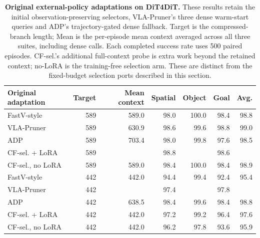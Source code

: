 \begin{table}[t]
  \centering
  \caption{\textbf{Original external-policy adaptations on DiT4DiT.}
  These results retain the initial observation-preserving selectors, VLA-Pruner's three dense warm-start queries and ADP's trajectory-gated dense fallback.
  Target is the compressed-branch length; Mean is the per-episode mean context averaged across all three suites, including dense calls.
  Each completed success rate uses 500 paired episodes.
  CF-sel.'s additional full-context probe is extra work beyond the retained context; no-LoRA is the training-free selection arm.
  These are distinct from the fixed-budget selection ports described in this section.}
  \label{tab:dit4dit_original_external}
  \footnotesize
  \setlength{\tabcolsep}{5pt}
  \begin{tabular}{lrrrrrr}
    \toprule
    Original adaptation & Target & Mean context & Spatial & Object & Goal & Avg. \\
    \midrule
    FastV-style & 589 & 589.0 & 98.0 & 100.0 & 98.4 & 98.8 \\
    VLA-Pruner & 589 & 630.9 & 98.6 & 99.6 & 98.8 & 99.0 \\
    ADP & 589 & 703.4 & 98.0 & 99.8 & 97.6 & 98.5 \\
    CF-sel. + LoRA & 589 & \TODO{--} & 98.8 & \TODO{--} & 98.6 & \TODO{--} \\
    CF-sel., no LoRA & 589 & 589.0 & 98.4 & 100.0 & 98.4 & 98.9 \\
    \midrule
    FastV-style & 442 & 442.0 & 94.4 & 99.4 & 92.4 & 95.4 \\
    VLA-Pruner & 442 & \TODO{--} & 97.4 & \TODO{--} & 97.8 & \TODO{--} \\
    ADP & 442 & 638.5 & 98.4 & 99.6 & 98.4 & 98.8 \\
    CF-sel. + LoRA & 442 & 442.0 & 97.2 & 99.2 & 96.4 & 97.6 \\
    CF-sel., no LoRA & 442 & 442.0 & 96.2 & 97.8 & 93.6 & 95.9 \\
    \bottomrule
  \end{tabular}
\end{table}
